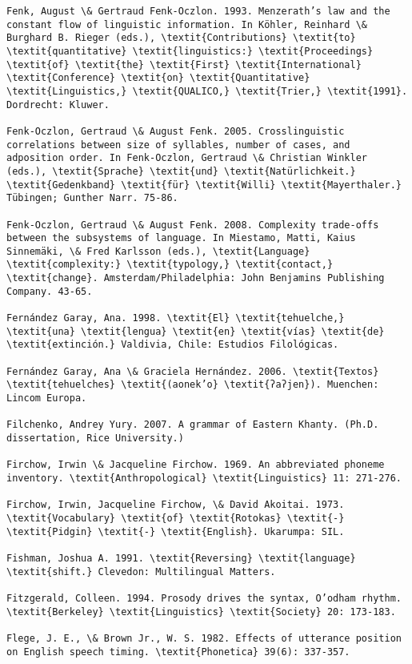 \begin{verbatim}
Fenk, August \& Gertraud Fenk-Oczlon. 1993. Menzerath’s law and the constant flow of linguistic information. In Köhler, Reinhard \& Burghard B. Rieger (eds.), \textit{Contributions} \textit{to} \textit{quantitative} \textit{linguistics:} \textit{Proceedings} \textit{of} \textit{the} \textit{First} \textit{International} \textit{Conference} \textit{on} \textit{Quantitative} \textit{Linguistics,} \textit{QUALICO,} \textit{Trier,} \textit{1991}. Dordrecht: Kluwer.

Fenk-Oczlon, Gertraud \& August Fenk. 2005. Crosslinguistic correlations between size of syllables, number of cases, and adposition order. In Fenk-Oczlon, Gertraud \& Christian Winkler (eds.), \textit{Sprache} \textit{und} \textit{Natürlichkeit.} \textit{Gedenkband} \textit{für} \textit{Willi} \textit{Mayerthaler.} Tübingen; Gunther Narr. 75-86.

Fenk-Oczlon, Gertraud \& August Fenk. 2008. Complexity trade-offs between the subsystems of language. In Miestamo, Matti, Kaius Sinnemäki, \& Fred Karlsson (eds.), \textit{Language} \textit{complexity:} \textit{typology,} \textit{contact,} \textit{change}. Amsterdam/Philadelphia: John Benjamins Publishing Company. 43-65.

Fernández Garay, Ana. 1998. \textit{El} \textit{tehuelche,} \textit{una} \textit{lengua} \textit{en} \textit{vías} \textit{de} \textit{extinción.} Valdivia, Chile: Estudios Filológicas.

Fernández Garay, Ana \& Graciela Hernández. 2006. \textit{Textos} \textit{tehuelches} \textit{(aonek’o} \textit{ʔaʔjen}). Muenchen: Lincom Europa.

Filchenko, Andrey Yury. 2007. A grammar of Eastern Khanty. (Ph.D. dissertation, Rice University.)

Firchow, Irwin \& Jacqueline Firchow. 1969. An abbreviated phoneme inventory. \textit{Anthropological} \textit{Linguistics} 11: 271-276.

Firchow, Irwin, Jacqueline Firchow, \& David Akoitai. 1973. \textit{Vocabulary} \textit{of} \textit{Rotokas} \textit{-} \textit{Pidgin} \textit{-} \textit{English}. Ukarumpa: SIL.

Fishman, Joshua A. 1991. \textit{Reversing} \textit{language} \textit{shift.} Clevedon: Multilingual Matters.

Fitzgerald, Colleen. 1994. Prosody drives the syntax, O’odham rhythm. \textit{Berkeley} \textit{Linguistics} \textit{Society} 20: 173-183.

Flege, J. E., \& Brown Jr., W. S. 1982. Effects of utterance position on English speech timing. \textit{Phonetica} 39(6): 337-357.


\end{verbatim}
